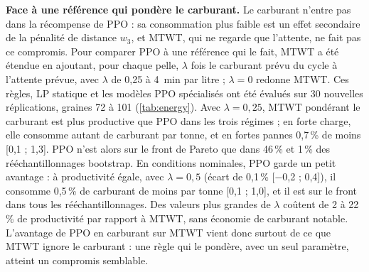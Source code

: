 \documentclass[11pt,a4paper]{article}
\newif\ifrevmarks
\newcommand{\revtag}[1]{\ifrevmarks\textsuperscript{\textcolor{red!70!black}{\scriptsize[#1]}}\fi}
\newenvironment{revbloc}[1]{\par\ifrevmarks\color{revcolor}\noindent\revtag{#1}\ \fi}{\par}
\newif\ifcorrmarks
\newcommand{\corr}[1]{\ifcorrmarks\textcolor{corrcolor}{#1}\else#1\fi}
\newenvironment{corrbloc}{\par\ifcorrmarks\color{corrcolor}\fi}{\par}
\begin{document}
\begin{revbloc}{T31}
\begin{corrbloc}
\textbf{Face à une référence qui pondère le carburant.} Le carburant n'entre pas dans la récompense de PPO : sa consommation plus faible est un effet secondaire de la pénalité de distance $w_3$, et MTWT, qui ne regarde que l'attente, ne fait pas ce compromis. Pour comparer PPO à une référence qui le fait, MTWT a été étendue en ajoutant, pour chaque pelle, $\lambda$ fois le carburant prévu du cycle à l'attente prévue, avec $\lambda$ de 0,25 à 4~min par litre ; $\lambda = 0$ redonne MTWT. Ces règles, \corr{LP statique} et les modèles PPO spécialisés ont été évalués sur 30 nouvelles réplications, graines 72 à 101 (\cref{tab:energy}). Avec $\lambda = 0{,}25$, MTWT pondérant le carburant est plus productive que PPO dans les trois régimes ; en forte charge, elle consomme autant de carburant par tonne, et en fortes pannes 0,7\,\% de moins [0,1 ; 1,3]. PPO n'est alors sur le front de Pareto que dans 46\,\% et 1\,\% des rééchantillonnages bootstrap. En conditions nominales, PPO garde un petit avantage : à productivité égale, avec $\lambda = 0{,}5$ (écart de 0,1\,\% [$-$0,2 ; 0,4]), il consomme 0,5\,\% de carburant de moins par tonne [0,1 ; 1,0], et il est sur le front dans tous les rééchantillonnages. Des valeurs plus grandes de $\lambda$ coûtent de 2 à 22\,\% de productivité par rapport à MTWT, sans économie de carburant notable. L'avantage de PPO en carburant sur MTWT vient donc surtout de ce que MTWT ignore le carburant : une règle qui le pondère, avec un seul paramètre, atteint un compromis semblable.


\end{corrbloc}
\end{revbloc}
\end{document}
